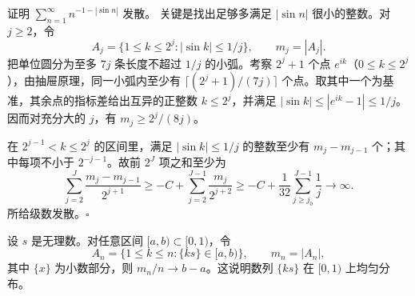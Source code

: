 证明 $\sum_{n=1}^{\infty}n^{-1-|\sin n|}$ 发散。
\pf 关键是找出足够多满足 $|\sin n|$ 很小的整数。对 $j\ge2$，令
\[
A_j=\{1\leq k\leq 2^j:|\sin k|\leq 1/j\},\qquad m_j=|A_j|.
\]
把单位圆分为至多 $7j$ 条长度不超过 $1/j$ 的小弧。考察 $2^j+1$ 个点 $e^{ik}$（$0\leq k\leq2^j$），由抽屉原理，同一小弧内至少有 $\lceil(2^j+1)/(7j)\rceil$ 个点。取其中一个为基准，其余点的指标差给出互异的正整数 $k\leq2^j$，并满足 $|\sin k|\leq|e^{ik}-1|\leq1/j$。因而对充分大的 $j$，有 $m_j\geq 2^j/(8j)$。

在 $2^{j-1}<k\leq2^j$ 的区间里，满足 $|\sin k|\leq1/j$ 的整数至少有 $m_j-m_{j-1}$ 个；其中每项不小于 $2^{-j-1}$。故前 $2^J$ 项之和至少为
\[
\sum_{j=2}^{J}\frac{m_j-m_{j-1}}{2^{j+1}}
\geq -C+\sum_{j=2}^{J-1}\frac{m_j}{2^{j+2}}
\geq-C+\frac1{32}\sum_{j\geq j_0}^{J-1}\frac1j\longrightarrow\infty.
\]
所给级数发散。\hfill$\square$

设 $s$ 是无理数。对任意区间 $[a,b)\subset[0,1)$，令
\[
A_n=\{1\leq k\leq n:\{ks\}\in[a,b)\},\qquad m_n=|A_n|,
\]
其中 $\{x\}$ 为小数部分，则 $m_n/n\to b-a$。这说明数列 $\{ks\}$ 在 $[0,1)$ 上均匀分布。
